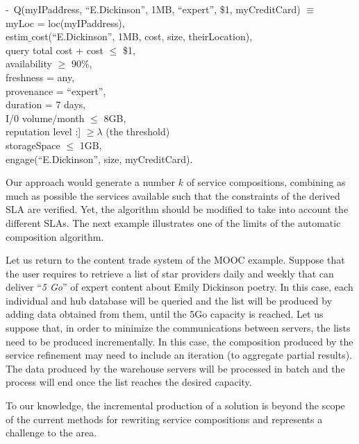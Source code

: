 \begin{footnotesize}
\sf
\begin{tabbing}
 -~Q(myIPad\=dress, ``E.Dickinson'', 1MB, ``expert'', \$1, myCreditCard) $\equiv$ \\
 \>  myLoc = loc(myIPaddress), \\
 \>  estim$\_$cost(``E.Dickinson'', 1MB, cost, size, theirLocation), \\
 \>  query total cost + cost $\leq$ \$1,\\
 \>  availability $\geq$ 90$\%$, \\
 \>  freshness = any, \\
 \>  provenance = ``expert'', \\
 \>  duration = 7 days, \\
 \>  I/0 volume/month $\leq$ 8GB, \\
 \>reputation level :] $\geq \lambda$ (the threshold) \\
 \>  storageSpace $\leq$ 1GB, \\
 \>  engage(``E.Dickinson'', size, myCreditCard).
 \end{tabbing} 
\end{footnotesize}

Our approach would generate a number $k$ of service compositions, combining as much as possible the services available such that the constraints of the derived SLA are verified. 
 Yet, the algorithm should be modified to take into account the different SLAs. The next example illustrates one of the limits of the automatic composition algorithm.

\color{red}
\begin{example}\label{Ex:rew2}
Let us return to the content  trade system of the MOOC example.
 Suppose that the user requires to retrieve a list of star providers  daily and weekly that can deliver ``\textit{5 Go}'' of expert content about Emily Dickinson poetry.
In this case, each individual and hub database will be queried and the list will be produced by adding data obtained from them, until the 5Go  capacity is reached.
Let us suppose that, in order to minimize the  communications between servers, the lists need to be produced incrementally.
In this case, the composition produced by the service refinement may need to include an iteration (to aggregate partial results). 
The data produced by the warehouse servers will be processed in batch and the process will end once the list reaches the desired capacity.

To our knowledge, the incremental production of a solution is beyond  the scope of the current methods for rewriting service compositions and represents a challenge to the area.
~\hfill\openbox
\end{example}

